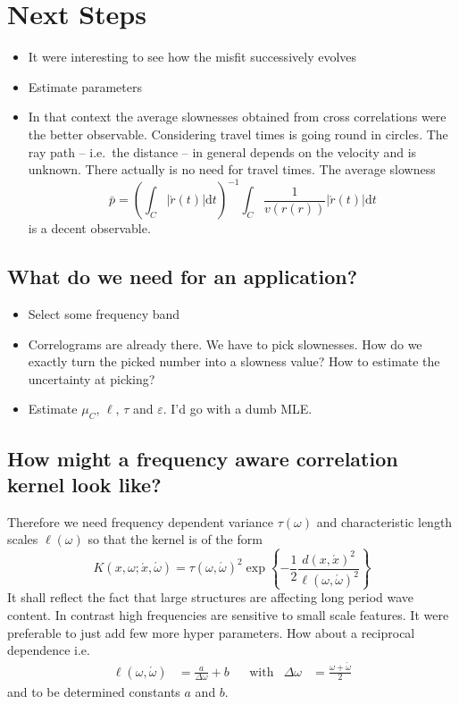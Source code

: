 \documentclass[11pt]{article}
\begin{document}
\section{Next Steps}

\begin{itemize}
    \item It were interesting to see how the misfit successively evolves
    \item Estimate parameters
    \item In that context the average slownesses obtained from cross correlations were the better observable.
        Considering travel times is going round in circles.
        The ray path -- i.e.~the distance -- in general depends on the velocity and is unknown.
        There actually is no need for travel times.
        The average slowness
        \begin{equation}
            \bar p = \left(\int_C |\acute r(t)| \mathrm d t \right)^{-1} \int_C \frac 1 {v(r(r))} |\acute r(t)| \mathrm d t
        \end{equation}
        is a decent observable.

\end{itemize}

\subsection{What do we need for an application?}

\begin{itemize}
    \item Select some frequency band
    \item Correlograms are already there. We have to pick slownesses. How do we exactly turn the picked number into a slowness value? How to estimate the uncertainty at picking?
    \item Estimate $\mu_C$, $\ell$, $\tau$ and $\varepsilon$. I'd go with a dumb MLE.
\end{itemize}

\subsection{How might a frequency aware correlation kernel look like?}

Therefore we need frequency dependent variance $\tau(\omega)$ and characteristic length scales $\ell(\omega)$ so that the kernel is of the form
\begin{equation}
    K(x,\omega;\acute x,\acute \omega) =
    \tau(\omega,\acute\omega)^2
    \exp\left\{-\frac12 \frac{d(x,\acute x)^2}{\ell(\omega,\acute\omega)^2}\right\}
\end{equation}
It shall reflect the fact that large structures are affecting long period wave content.
In contrast high frequencies are sensitive to small scale features.
It were preferable to just add few more hyper parameters.
How about a reciprocal dependence i.e.
\begin{align}
    \ell(\omega, \acute \omega) &= \frac a{\Delta \omega} + b &
    &\text{with}&
    \Delta \omega &= \frac{\omega + \acute\omega}2
\end{align}
and to be determined constants $a$ and $b$.

\printbibliography
\end{document}
